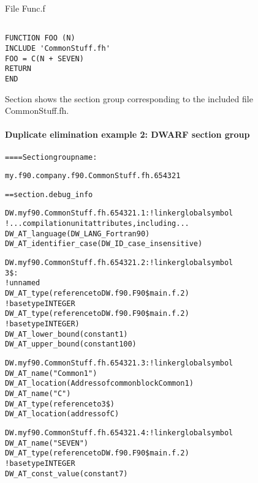 File Func.f
\begin{lstlisting}

FUNCTION FOO (N)
INCLUDE 'CommonStuff.fh'
FOO = C(N + SEVEN)
RETURN
END
\end{lstlisting}


Section 
shows the section group 
corresponding to the included file CommonStuff.fh.

\paragraph{Duplicate elimination example 2: DWARF section group}
\label{app:duplicateeliminationexample2dwarfsectiongroup}

\begin{alltt}
==== Section group name:

    my.f90.company.f90.CommonStuff.fh.654321

== section .debug\_info

DW.myf90.CommonStuff.fh.654321.1:    ! linker global symbol
        ! ...compilation unit attributes, including...
        DW\_AT\_language(DW\_LANG\_Fortran90)
        DW\_AT\_identifier\_case(DW\_ID\_case\_insensitive)

DW.myf90.CommonStuff.fh.654321.2: ! linker global symbol
3\$: 
        ! unnamed
        DW\_AT\_type(reference to DW.f90.F90\$main.f.2)
            ! base type INTEGER
            DW\_AT\_type(reference to DW.f90.F90\$main.f.2)
                ! base type INTEGER)
            DW\_AT\_lower\_bound(constant 1)
            DW\_AT\_upper\_bound(constant 100)

DW.myf90.CommonStuff.fh.654321.3: ! linker global symbol
        DW\_AT\_name("Common1")
        DW\_AT\_location(Address of common block Common1)
            DW\_AT\_name("C")
            DW\_AT\_type(reference to 3\$)
            DW\_AT\_location(address of C)

DW.myf90.CommonStuff.fh.654321.4: ! linker global symbol
        DW\_AT\_name("SEVEN")
        DW\_AT\_type(reference to DW.f90.F90\$main.f.2)
            ! base type INTEGER
        DW\_AT\_const\_value(constant 7)
\end{alltt}

